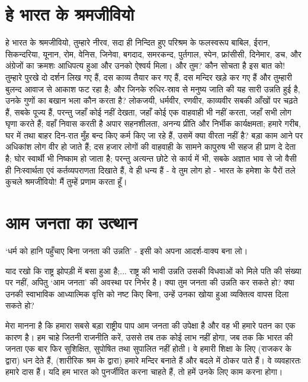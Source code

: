 \section*{हे भारत के श्रमजीवियो}


हे भारत के श्रमजीवियो, तुम्हारे नीरव, सदा ही निन्दित हुए परिश्रम के फलस्वरूप बाबिल, ईरान, सिकन्दरिया, यूनान, रोम, वेनिस, जिनेवा, बगदाद, समरकन्द, पुर्तगाल, स्पेन, फ्रांसीसी, दिनेमार, डच, और अंग्रेजों का क्रमशः आधिपत्य हुआ और उनको ऐश्वर्य मिला। और तुम? कौन सोचता है इस बात को! तुम्हारे पुरखे दो दर्शन लिख गए हैं, दस काव्य तैयार कर गए हैं, दस मन्दिर खड़े कर गए हैं और तुम्हारी बुलन्द आवाज से आकाश फट रहा है; और जिनके रुधिर-स्राव से मनुष्य जाति की यह सारी उन्नति हुई है, उनके गुणों का बखान भला कौन करता है? लोकजयी, धर्मवीर, रणवीर, काव्यवीर सबकी आँखों पर चढ़ते हैं, सबके पूज्य हैं, परन्तु जहाँ कोई नहीं देखता, जहाँ कोई एक वाहवाही भी नहीं करता, जहाँ सभी लोग घृणा करते हैं; वहाँ निवास करती है अपार सहनशीलता, अनन्य प्रीति और निर्भीक कार्यक्षमता; हमारे गरीब, घर में तथा बाहर दिन-रात मुँह बन्द किए कर्म किए जा रहे हैं, उसमें क्या वीरता नहीं है? बड़ा काम आने पर अधिकांश लोग वीर हो जाते हैं; दस हजार लोगों की वाहवाही के सामने कापुरुष भी सहज ही प्राण दे देता है; घोर स्वार्थी भी निष्काम हो जाता है; परन्तु अत्यन्त छोटे से कार्य में भी, सबके अज्ञात भाव से जो वैसी ही निःस्वार्थता एवं कर्तव्यपराणता दिखाते हैं, वे ही धन्य हैं - वे तुम लोग हो - भारत के हमेशा के पैरों तले कुचले श्रमजीवियो! मैं तुम्हें प्रणाम करता हूँ।


\section*{आम जनता का उत्थान}


‘धर्म को हानि पहुँचाए बिना जनता की उन्नति’ - इसी को अपना आदर्श-वाक्य बना लो। 

याद रखो कि राष्ट्र झोपड़ी में बसा हुआ है;... राष्ट्र की भावी उन्नति उसकी विधवाओं को मिले पति की संख्या पर नहीं, अपितु ‘आम जनता’ की अवस्था पर निर्भर है। क्या तुम जनता की उन्नति कर सकते हो? क्या उनकी स्वाभाविक आध्यात्मिक वृत्ति को नष्ट किए बिना, उन्हें उनका खोया हुआ व्यक्तित्व वापस दिला सकते हो? 

मेरा मानना है कि हमारा सबसे बड़ा राष्ट्रीय पाप आम जनता की उपेक्षा है और वह भी हमारे पतन का एक कारण है। हम चाहे जितनी राजनीति करें, उससे तब तक कोई लाभ नहीं होगा, जब तक कि भारत की जनता एक बार फिर सुशिक्षित, सुपोषित तथा सुपालित नहीं होती। वे हमारी शिक्षा के लिए (राजकर के द्वारा) धन देते हैं, (शारीरिक श्रम के द्वारा) हमारे मन्दिर बनाते हैं और बदले में ठोकर पाते हैं। वे व्यवहारतः हमारे दास हैं। यदि हम भारत को पुनर्जीवित करना चाहते हैं, तो हमें उनके लिए काम करना होगा। 

